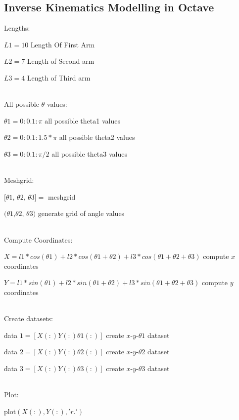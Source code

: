 \documentclass[11pt]{article}
\begin{document}
\subsection{Inverse Kinematics Modelling in Octave}
Lengths: \\
\centerline{$L1 = 10 $  Length Of First Arm}
\centerline{$L2 = 7 $  Length of Second arm}
\centerline{$L3 = 4 $  Length of Third arm}
\\[1\baselineskip]
All possible $\theta$ values: \\
\centerline{$\theta 1 = 0:0.1:\pi$  all possible theta1 values}
\centerline{$\theta 2 = 0:0.1:1.5*\pi$  all possible theta2 values}
\centerline{$\theta 3 = 0:0.1:\pi/2$  all possible theta3 values}
\\[1\baselineskip]
Meshgrid: \\
\centerline{$[ \theta{1} $, $ \theta{2} $, $ \theta{3} ] = $ meshgrid} \centerline{$ (\theta1 $,$ \theta2 $, $ \theta3) $  generate grid of angle values}
\\[1\baselineskip]
Compute Coordinates:\\
\centerline{$X = l1 * cos(\theta 1) + l2 * cos(\theta 1 + \theta 2) + l3 * cos(\theta 1 + \theta 2 + \theta 3) $  compute $x$ coordinates}
\centerline{$Y = l1 * sin(\theta 1) + l2 * sin(\theta 1 + \theta 2) + l3 * sin(\theta 1 + \theta 2 + \theta 3) $  compute $y$ coordinates}
\\[1\baselineskip]
Create datasets:\\
\centerline{data $1 = [X(:) Y(:) \theta 1(:)] $ create $x$-$y$-$\theta1$  dataset}
\centerline{data $2 = [X(:) Y(:) \theta 2(:)] $ create $x$-$y$-$\theta2$  dataset}
\centerline{data $3 = [X(:) Y(:) \theta 3(:)] $ create $x$-$y$-$\theta3$  dataset}
\\[1\baselineskip]
Plot:\\
\centerline{plot$(X(:),Y(:),'r.')$}
\end{document}
